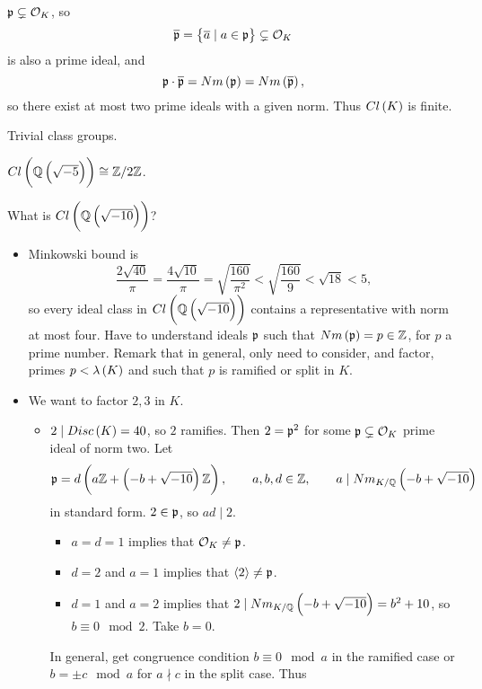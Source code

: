 \begin{note*}
$ \mathfrak{p} \subsetneq \mathcal{O}_K $, so
$$ \overline{\pp} = \cbr{\overline{a} \mid a \in \pp} \subsetneq \OO_K $$
is also a prime ideal, and
$$ \pp \cdot \overline{\pp} = Nm\br{\pp} = Nm\br{\overline{\pp}}, $$
so there exist at most two prime ideals with a given norm. Thus $ Cl\br{K} $ is finite.
\end{note*}

\begin{example*}
Trivial class groups.
\end{example*}

\begin{example*}
$ Cl\br{\Q\br{\sqrt{-5}}} \cong \Z / 2\Z $.
\end{example*}

\begin{example*}
What is $ Cl\br{\Q\br{\sqrt{-10}}} $?
\begin{itemize}
\item Minkowski bound is
$$ \dfrac{2\sqrt{40}}{\pi} = \dfrac{4\sqrt{10}}{\pi} = \sqrt{\dfrac{160}{\pi^2}} < \sqrt{\dfrac{160}{9}} < \sqrt{18} < 5, $$
so every ideal class in $ Cl\br{\Q\br{\sqrt{-10}}} $ contains a representative with norm at most four. Have to understand ideals $ \mathfrak{p} $ such that $ Nm\br{\pp} = p \in \Z $, for $ p $ a prime number. Remark that in general, only need to consider, and factor, primes $ p < \lambda\br{K} $ and such that $ p $ is ramified or split in $ K $.
\item We want to factor $ 2, 3 $ in $ K $.
\begin{itemize}
\item $ 2 \mid Disc\br{K} = 40 $, so $ 2 $ ramifies. Then $ 2 = \mathfrak{p}^2 $ for some $ \mathfrak{p} \subsetneq \mathcal{O}_K $ prime ideal of norm two. Let
$$ \pp = d\br{a\Z + \br{-b + \sqrt{-10}}\Z}, \qquad a, b, d \in \Z, \qquad a \mid Nm_{K / \Q}\br{-b + \sqrt{-10}} $$
in standard form. $ 2 \in \mathfrak{p} $, so $ ad \mid 2 $.
\begin{itemize}
\item $ a = d = 1 $ implies that $ \mathcal{O}_K \ne \mathfrak{p} $.
\item $ d = 2 $ and $ a = 1 $ implies that $ \left\langle 2 \right\rangle \ne \mathfrak{p} $.
\item $ d = 1 $ and $ a = 2 $ implies that $ 2 \mid Nm_{K / \Q}\br{-b + \sqrt{-10}} = b^2 + 10 $, so $ b \equiv 0 \mod 2 $. Take $ b = 0 $.
\end{itemize}
In general, get congruence condition $ b \equiv 0 \mod a $ in the ramified case or $ b = \pm c \mod a $ for $ a \nmid c $ in the split case. Thus

\end{itemize}
\end{itemize}
\end{example*}
